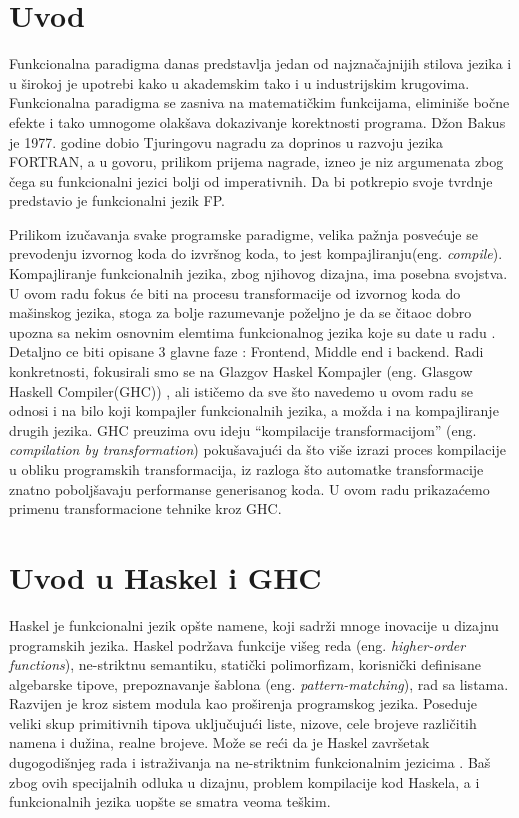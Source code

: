 \section{Uvod}
\label{sec:uvod}

Funkcionalna paradigma danas predstavlja jedan od najznačajnijih stilova jezika i u širokoj je upotrebi kako u akademskim tako i u industrijskim krugovima. Funkcionalna paradigma se zasniva na matematičkim funkcijama, eliminiše bočne efekte i tako umnogome olakšava dokazivanje korektnosti programa. Džon Bakus je 1977. godine dobio Tjuringovu nagradu za doprinos u razvoju jezika FORTRAN, a u govoru, prilikom prijema nagrade, izneo je niz argumenata zbog čega su funkcionalni jezici bolji od imperativnih. Da bi potkrepio svoje tvrdnje predstavio je funkcionalni jezik FP.

Prilikom izučavanja svake programske paradigme, velika pažnja posvećuje se prevodenju izvornog koda do izvršnog koda, to jest kompajliranju(eng. \emph{compile}). Kompajliranje funkcionalnih jezika, zbog njihovog dizajna, ima posebna svojstva. U ovom radu fokus će biti na procesu transformacije od izvornog koda do mašinskog jezika, stoga za bolje razumevanje poželjno je da se čitaoc dobro upozna sa nekim osnovnim elemtima funkcionalnog jezika koje su date u radu \cite{ajzenhamer} . Detaljno ce biti opisane 3 glavne faze : Frontend, Middle end i backend. Radi konkretnosti, fokusirali smo se na Glazgov Haskel Kompajler (eng. Glasgow Haskell Compiler(GHC)) \cite{GHCxx}, ali ističemo da sve što navedemo u ovom radu se odnosi i na bilo koji kompajler funkcionalnih jezika, a možda i na kompajliranje drugih jezika. GHC preuzima ovu ideju “kompilacije transformacijom” (eng. \emph{compilation by transformation}) pokušavajući da što više izrazi proces kompilacije u obliku programskih transformacija, iz razloga što automatke transformacije znatno poboljšavaju performanse generisanog koda. U ovom radu prikazaćemo primenu transformacione tehnike kroz GHC. 

\section{Uvod u Haskel i GHC} 

Haskel je funkcionalni jezik opšte namene, koji sadrži mnoge inovacije u dizajnu programskih jezika. Haskel podržava funkcije višeg reda (eng. \emph{ higher-order functions}), ne-striktnu semantiku, statički polimorfizam, korisnički definisane algebarske tipove, prepoznavanje šablona (eng. \emph{ pattern-matching}), rad sa listama. Razvijen je kroz sistem modula kao proširenja programskog jezika. Poseduje veliki skup primitivnih tipova uključujući liste, nizove, cele brojeve različitih namena i dužina, realne brojeve. Može se reći da je Haskel završetak dugogodišnjeg rada i istraživanja na ne-striktnim funkcionalnim jezicima \cite{Has10}. Baš zbog ovih specijalnih odluka u dizajnu, problem kompilacije kod Haskela, a i funkcionalnih jezika uopšte se smatra veoma teškim.   


